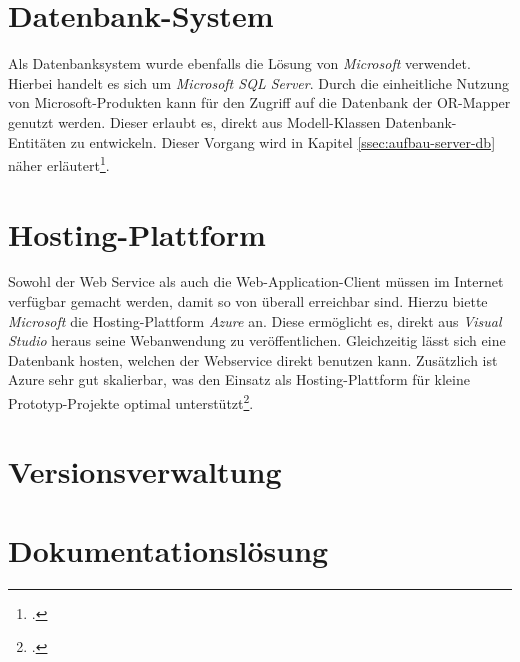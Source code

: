 \section{Datenbank-System}
\label{sec:DB-System}
Als Datenbanksystem wurde ebenfalls die Lösung von \textit{Microsoft} verwendet. Hierbei handelt es sich um \textit{Microsoft SQL Server}. Durch die einheitliche Nutzung von Microsoft-Produkten kann für den Zugriff auf die Datenbank der \ac{OR-Mapper} genutzt werden. Dieser erlaubt es, direkt aus Modell-Klassen Datenbank-Entitäten zu entwickeln. Dieser Vorgang wird in Kapitel \ref{ssec:aufbau-server-db} näher erläutert\footcite{online:SQLServer}.
\section{Hosting-Plattform}
\label{sec:Hosting-Plattform}
Sowohl der Web Service als auch die Web-Application-Client müssen im Internet verfügbar gemacht werden, damit so von überall erreichbar sind. Hierzu biette \textit{Microsoft} die Hosting-Plattform \textit{Azure} an. Diese ermöglicht es, direkt aus \textit{Visual Studio} heraus seine Webanwendung zu veröffentlichen. Gleichzeitig lässt sich eine Datenbank hosten, welchen der Webservice direkt benutzen kann. Zusätzlich ist Azure sehr gut skalierbar, was den Einsatz als Hosting-Plattform für kleine Prototyp-Projekte optimal unterstützt\footcite{online:Azure}.
\section{Versionsverwaltung}
\label{sec:versionsverwaltung}

\section{Dokumentationslösung}
\label{sec:dokumentationslösung}

 
